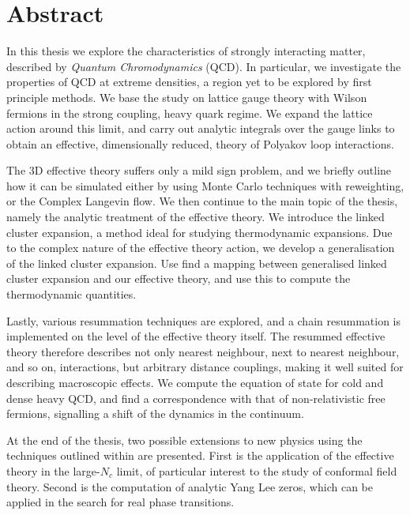 \chapter*{Abstract}
{\fontsize{12pt}{18pt}\selectfont

In this thesis we explore the characteristics of strongly interacting matter,
described by \emph{Quantum Chromodynamics} (QCD). In particular, we investigate
the properties of QCD at extreme densities, a region yet to be explored by first
principle methods. We base the study on lattice gauge theory with Wilson
fermions in the strong coupling, heavy quark regime. We expand the lattice
action around this limit, and carry out analytic integrals over the gauge links
to obtain an effective, dimensionally reduced, theory of Polyakov loop
interactions.

The 3D effective theory suffers only a mild sign problem, and we briefly outline
how it can be simulated either by using Monte Carlo techniques with reweighting,
or the Complex Langevin flow. We then continue to the main topic of the thesis,
namely the analytic treatment of the effective theory. We introduce the linked
cluster expansion, a method ideal for studying thermodynamic expansions. Due to
the complex nature of the effective theory action, we develop a generalisation
of the linked cluster expansion. Use find a mapping between generalised linked
cluster expansion and our effective theory, and use this to compute the
thermodynamic quantities.

Lastly, various resummation techniques are explored, and a chain resummation is
implemented on the level of the effective theory itself. The resummed effective
theory therefore describes not only nearest neighbour, next to nearest
neighbour, and so on, interactions, but arbitrary distance couplings, making it
well suited for describing macroscopic effects. We compute the equation of state
for cold and dense heavy QCD, and find a correspondence with that of
non-relativistic free fermions, signalling a shift of the dynamics in the
continuum.

At the end of the thesis, two possible extensions to new physics using the
techniques outlined within are presented. First is the application of the
effective theory in the large-$N_c$ limit, of particular interest to the study
of conformal field theory. Second is the computation of analytic Yang Lee zeros,
which can be applied in the search for real phase transitions.

}
